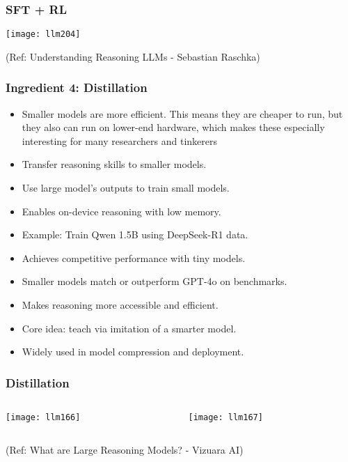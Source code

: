 \begin{frame}[fragile]\frametitle{SFT + RL}

  
  		\begin{center}
		\texttt{[image: llm204]}
		
		{\tiny (Ref: Understanding Reasoning LLMs - Sebastian Raschka)}

		\end{center}

\end{frame}


\begin{frame}[fragile]\frametitle{Ingredient 4: Distillation}
\begin{itemize}
	\item Smaller models are more efficient. This means they are cheaper to run, but they also can run on lower-end hardware, which makes these especially interesting for many researchers and tinkerers
  \item Transfer reasoning skills to smaller models.
  \item Use large model’s outputs to train small models.
  \item Enables on-device reasoning with low memory.
  \item Example: Train Qwen 1.5B using DeepSeek-R1 data.
  \item Achieves competitive performance with tiny models.
  \item Smaller models match or outperform GPT-4o on benchmarks.
  \item Makes reasoning more accessible and efficient.
  \item Core idea: teach via imitation of a smarter model.
  \item Widely used in model compression and deployment.
\end{itemize}
\end{frame}

\begin{frame}[fragile]\frametitle{Distillation}


\begin{columns}
    \begin{column}[T]{0.5\linewidth}
		\begin{center}
		\texttt{[image: llm166]}
		\end{center}

    \end{column}
    \begin{column}[T]{0.5\linewidth}
		\begin{center}
		\texttt{[image: llm167]}
		\end{center}
    \end{column}
  \end{columns}
  

{\tiny (Ref: What are Large Reasoning Models? - Vizuara AI)}

\end{frame}

